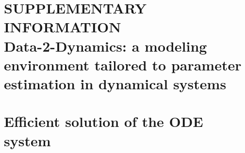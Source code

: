 \documentclass[12pt,a4paper]{scrartcl}
\begin{document}
\section*{SUPPLEMENTARY INFORMATION\\Data-2-Dynamics: a modeling environment tailored to parameter estimation in dynamical systems}

\renewcommand*\contentsname{Contents}
\tableofcontents

\section{Efficient solution of the ODE system} \label{sec:ode_solvers}



\end{document}
